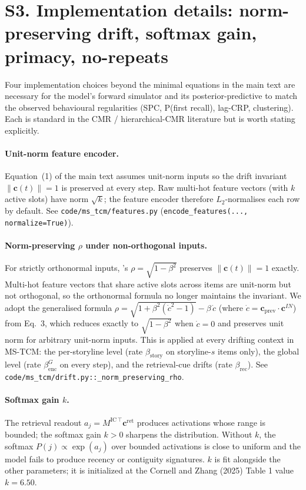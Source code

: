 \documentclass{article}
\begin{document}
\section*{S3. Implementation details: norm-preserving drift, softmax gain, primacy, no-repeats}

Four implementation choices beyond the minimal equations in the main
text are necessary for the model's forward simulator and its
posterior-predictive to match the observed behavioural regularities
(SPC, P(first recall), lag-CRP, clustering). Each is standard in the
CMR / hierarchical-CMR literature but is worth stating explicitly.

\paragraph{Unit-norm feature encoder.}
Equation~(1) of the main text assumes unit-norm inputs so the drift
invariant $\|\mathbf{c}(t)\| = 1$ is preserved at every step. Raw
multi-hot feature vectors (with $k$ active slots) have norm
$\sqrt{k}$; the feature encoder therefore $L_{2}$-normalises each row
by default. See \texttt{code/ms\_tcm/features.py}
(\texttt{encode\_features(..., normalize=True)}).

\paragraph{Norm-preserving $\rho$ under non-orthogonal inputs.}
For strictly orthonormal inputs, \citet{HowaKaha02a}'s
$\rho = \sqrt{1 - \beta^2}$ preserves $\|\mathbf{c}(t)\| = 1$
exactly. Multi-hot feature vectors that share active slots across
items are unit-norm but not orthogonal, so the orthonormal formula no
longer maintains the invariant. We adopt the generalised formula
$\rho = \sqrt{1 + \beta^{2}(\dot{c}^{2} - 1)} - \beta\,\dot{c}$
(where $\dot{c} = \mathbf{c}_{\mathrm{prev}} \cdot \mathbf{c}^{IN}$)
from \citet{PolyEtal09} Eq.~3, which reduces exactly to
$\sqrt{1 - \beta^{2}}$ when $\dot{c} = 0$ and preserves unit norm for
arbitrary unit-norm inputs. This is applied at every drifting context
in MS-TCM: the per-storyline level (rate $\beta_{\mathrm{story}}$ on
storyline-$s$ items only), the global level (rate
$\beta_{\mathrm{enc}}^{G}$ on every step), and the retrieval-cue
drifts (rate $\beta_{\mathrm{rec}}$). See
\texttt{code/ms\_tcm/drift.py::\_norm\_preserving\_rho}.

\paragraph{Softmax gain $k$.}
The retrieval readout $a_{j} = M^{\mathrm{IC}\,\top} \mathbf{c}^{\mathrm{ret}}$
produces activations whose range is bounded; the softmax gain
$k > 0$ sharpens the distribution. Without $k$, the softmax
$P(j) \propto \exp(a_{j})$ over bounded activations is close to
uniform and the model fails to produce recency or contiguity
signatures. $k$ is fit alongside the other parameters; it is
initialized at the Cornell and Zhang (2025) Table 1 value
$k = 6.50$.
\end{document}
